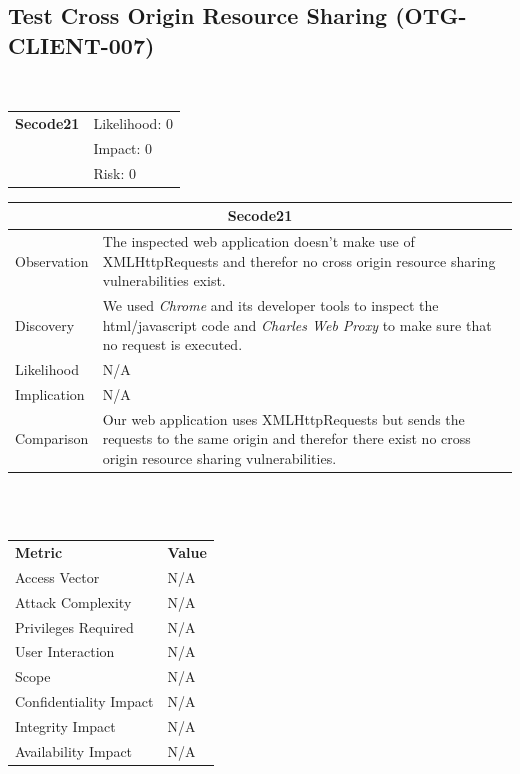 \documentclass[headsepline,footsepline,footinclude=false,oneside,fontsize=11pt,paper=a4,listof=totoc,bibliography=totoc]{scrbook} %
\begin{document}
\subsection{Test Cross Origin Resource Sharing (OTG-CLIENT-007)}\
\begin{tabular}{cR{12cm}}
	\textbf{Secode21} & Likelihood: 0\\& Impact: 0\\& Risk: 0
\end{tabular}

\begin{tabular}{ l|p{11cm}  }
	\hline
	\multicolumn{2}{c}{\textbf{Secode21}} \\
	\hline
	Observation   & The inspected web application doesn't make use of XMLHttpRequests and therefor no cross origin resource sharing vulnerabilities exist. \\
	Discovery  & We used \textit{Chrome} and its developer tools to inspect the html/javascript code and \textit{Charles Web Proxy} to make sure that no request is executed. \\
	Likelihood & N/A \\
	Implication    & N/A \\
	Comparison & Our web application uses XMLHttpRequests but sends the requests to the same origin and therefor there exist no cross origin resource sharing vulnerabilities. \\
	\hline
\end{tabular}
\\
\vspace{0.5cm}
\\
\begin{center}
	\begin{tabular}{ll}
		\rowcolor[HTML]{34CDF9}
		{\color[HTML]{ECF4FF} \textbf{Metric}}        & {\color[HTML]{ECF4FF} \textbf{Value}} \\
		\rowcolor[HTML]{BBDAFF}
		{\color[HTML]{333333} Access Vector}          & {\color[HTML]{333333} } N/A              \\
		\rowcolor[HTML]{ECF4FF}
		{\color[HTML]{333333} Attack Complexity}      & {\color[HTML]{333333} } N/A              \\
		\rowcolor[HTML]{BBDAFF}
		{\color[HTML]{333333} Privileges Required}    & {\color[HTML]{333333} } N/A              \\
		\rowcolor[HTML]{ECF4FF}
		{\color[HTML]{333333} User Interaction}       & {\color[HTML]{333333} } N/A              \\
		\rowcolor[HTML]{BBDAFF}
		{\color[HTML]{333333} Scope}                  & {\color[HTML]{333333} } N/A              \\
		\rowcolor[HTML]{ECF4FF}
		{\color[HTML]{333333} Confidentiality Impact} & {\color[HTML]{333333} } N/A              \\
		\rowcolor[HTML]{BBDAFF}
		{\color[HTML]{333333} Integrity Impact}       & {\color[HTML]{333333} } N/A              \\
		\rowcolor[HTML]{ECF4FF}
		{\color[HTML]{333333} Availability Impact}    & {\color[HTML]{333333} } N/A
	\end{tabular}
\end{center}
\pagebreak
\end{document}
